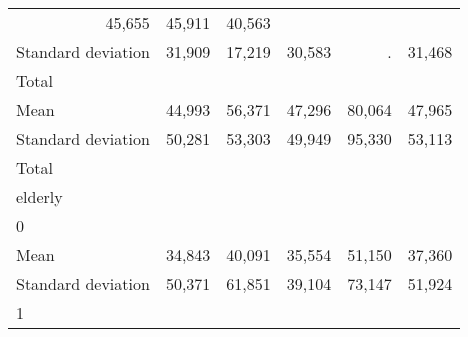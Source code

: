 \begin{tabular}{llllll}
  \multicolumn{1}{r}{45,655} &
  \multicolumn{1}{r}{45,911} &
  \multicolumn{1}{r}{40,563} \\
\multicolumn{1}{l}{\hspace{4em}Standard deviation} &
  \multicolumn{1}{|r}{31,909} &
  \multicolumn{1}{r}{17,219} &
  \multicolumn{1}{r}{30,583} &
  \multicolumn{1}{r}{.} &
  \multicolumn{1}{r}{31,468} \\
\multicolumn{1}{l}{\hspace{3em}Total} &
  \multicolumn{1}{|r}{} &
  \multicolumn{1}{r}{} &
  \multicolumn{1}{r}{} &
  \multicolumn{1}{r}{} &
  \multicolumn{1}{r}{} \\
\multicolumn{1}{l}{\hspace{4em}Mean} &
  \multicolumn{1}{|r}{44,993} &
  \multicolumn{1}{r}{56,371} &
  \multicolumn{1}{r}{47,296} &
  \multicolumn{1}{r}{80,064} &
  \multicolumn{1}{r}{47,965} \\
\multicolumn{1}{l}{\hspace{4em}Standard deviation} &
  \multicolumn{1}{|r}{50,281} &
  \multicolumn{1}{r}{53,303} &
  \multicolumn{1}{r}{49,949} &
  \multicolumn{1}{r}{95,330} &
  \multicolumn{1}{r}{53,113} \\
\multicolumn{1}{l}{\hspace{1em}Total} &
  \multicolumn{1}{|r}{} &
  \multicolumn{1}{r}{} &
  \multicolumn{1}{r}{} &
  \multicolumn{1}{r}{} &
  \multicolumn{1}{r}{} \\
\multicolumn{1}{l}{\hspace{2em}elderly} &
  \multicolumn{1}{|r}{} &
  \multicolumn{1}{r}{} &
  \multicolumn{1}{r}{} &
  \multicolumn{1}{r}{} &
  \multicolumn{1}{r}{} \\
\multicolumn{1}{l}{\hspace{3em}0} &
  \multicolumn{1}{|r}{} &
  \multicolumn{1}{r}{} &
  \multicolumn{1}{r}{} &
  \multicolumn{1}{r}{} &
  \multicolumn{1}{r}{} \\
\multicolumn{1}{l}{\hspace{4em}Mean} &
  \multicolumn{1}{|r}{34,843} &
  \multicolumn{1}{r}{40,091} &
  \multicolumn{1}{r}{35,554} &
  \multicolumn{1}{r}{51,150} &
  \multicolumn{1}{r}{37,360} \\
\multicolumn{1}{l}{\hspace{4em}Standard deviation} &
  \multicolumn{1}{|r}{50,371} &
  \multicolumn{1}{r}{61,851} &
  \multicolumn{1}{r}{39,104} &
  \multicolumn{1}{r}{73,147} &
  \multicolumn{1}{r}{51,924} \\
\multicolumn{1}{l}{\hspace{3em}1} &

\end{tabular}
